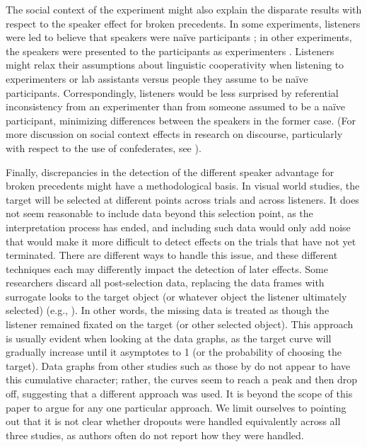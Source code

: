 \documentclass[doc,fignum,apacite,floatsintext]{apa6}
\begin{document}
The social context of the experiment might also explain the disparate results with respect to the speaker effect for broken precedents.  In some experiments, listeners were led to believe that speakers were na\"ive participants \cite{kronmullerbarr07}; in other experiments, the speakers were presented to the participants as experimenters \cite{metzingbrennan03,brownschmidt09}.  Listeners might relax their assumptions about linguistic cooperativity when listening to experimenters or lab assistants versus people they assume to be na\"ive participants.  Correspondingly, listeners would be less surprised by referential inconsistency from an experimenter than from someone assumed to be a na\"ive participant, minimizing differences between the speakers in the former case. (For more discussion on social context effects in research on discourse, particularly with respect to the use of confederates, see \cite{kuhlenbrennan13}).

Finally, discrepancies in the detection of the different speaker advantage for broken precedents might have a methodological basis.  In visual world studies, the target will be selected at different points across trials and across listeners.  It does not seem reasonable to include data beyond this selection point, as the interpretation process has ended, and including such data would only add noise that would make it more difficult to detect effects on the trials that have not yet terminated.  There are different ways to handle this issue, and these different techniques each may differently impact the detection of later effects.  Some researchers discard all post-selection data, replacing the data frames with surrogate looks to the target object (or whatever object the listener ultimately selected) (e.g., ).  In other words, the missing data is treated as though the listener remained fixated on the target (or other selected object).  This approach is usually evident when looking at the data graphs, as the target curve will gradually increase until it asymptotes to 1 (or the probability of choosing the target).  Data graphs from other studies such as those by  do not appear to have this cumulative character; rather, the curves seem to reach a peak and then drop off, suggesting that a different approach was used.  It is beyond the scope of this paper to argue for any one particular approach.  We limit ourselves to pointing out that it is not clear whether dropouts were handled equivalently across all three studies, as authors often do not report how they were handled.
\end{document}
